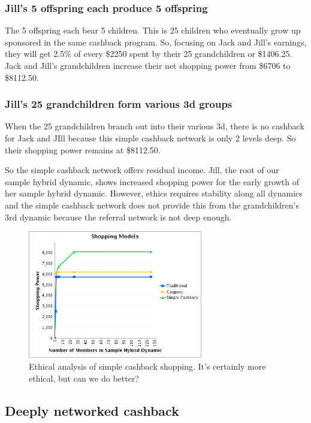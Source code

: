 \documentclass{article}%
\begin{document}
\subsubsection{Jill's 5 offspring each produce 5 offspring} 

    The 5 offspring each bear 5 children. This is 25 children who eventually grow up sponsored in the same cashback program. So, focusing on Jack and Jill's earnings, they will get 2.5\% of every \$2250 spent by their 25 grandchildren or \$1406.25. Jack and Jill's grandchildren increase their net shopping power from \$6706 to \$8112.50.

\subsubsection{Jill's 25 grandchildren form various 3d groups}

    When the 25 grandchildren branch out into their various 3d, there is no cashback for Jack and JIll because this simple cashback network is only 2 levels deep. So their shopping power remains at \$8112.50.

So the simple cashback network offers residual income. Jill, the root of our sample hybrid dynamic, shows increased shopping power for the early growth of her sample hybrid dynamic. However, ethics requires stability along all dynamics and the simple cashback network does not provide this from the grandchildren's 3rd dynamic because the referral network is not deep enough. 

\begin{figure}[h]
\centering
	\includegraphics[width=3in]{shopping-simple-cashback.png}
	\caption{Ethical analysis of simple cashback shopping. It's certainly more ethical, but can we do better?}
\end{figure}

\subsection{Deeply networked cashback}
\end{document}

